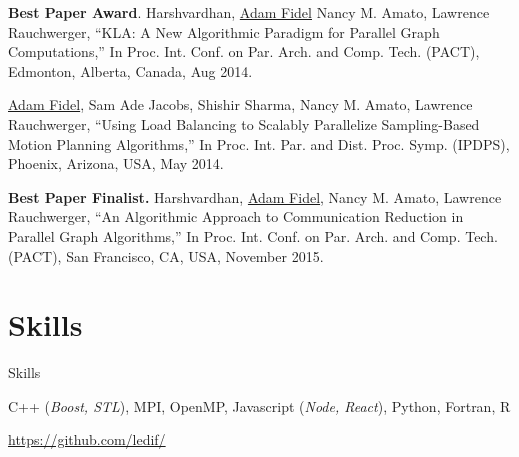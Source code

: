 \documentclass[a4paper,10pt,oneside]{article}
\begin{document}
\begin{body}
\begin{detail}
{{\bf Best Paper Award}. Harshvardhan, \underline{Adam Fidel} Nancy M. Amato, Lawrence Rauchwerger, ``KLA: A New Algorithmic Paradigm for Parallel Graph Computations,'' In Proc. Int. Conf. on Par. Arch. and Comp. Tech. (PACT), Edmonton, Alberta, Canada, Aug 2014.}
\end{detail}

\EntryGap

\begin{detail}
{\underline{Adam Fidel}, Sam Ade Jacobs, Shishir Sharma, Nancy M. Amato, Lawrence Rauchwerger, ``Using Load Balancing to Scalably Parallelize Sampling-Based Motion Planning Algorithms,'' In Proc. Int. Par. and Dist. Proc. Symp. (IPDPS), Phoenix, Arizona, USA, May 2014.}
\end{detail}

\EntryGap

\begin{detail}
{{\bf Best Paper Finalist.} Harshvardhan, \underline{Adam Fidel}, Nancy M. Amato, Lawrence Rauchwerger, ``An Algorithmic Approach to Communication Reduction in Parallel Graph Algorithms,'' In Proc. Int. Conf. on Par. Arch. and Comp. Tech. (PACT), San Francisco, CA, USA, November 2015.}
\end{detail}


\section{Skills}
{Skills}

C++ (\emph{Boost, STL}), MPI, OpenMP, Javascript (\emph{Node, React}), Python, Fortran, R
\par
\EntryGap
\href{https://github.com/ledif/}{https://github.com/ledif/}

\end{body}
\end{document}
